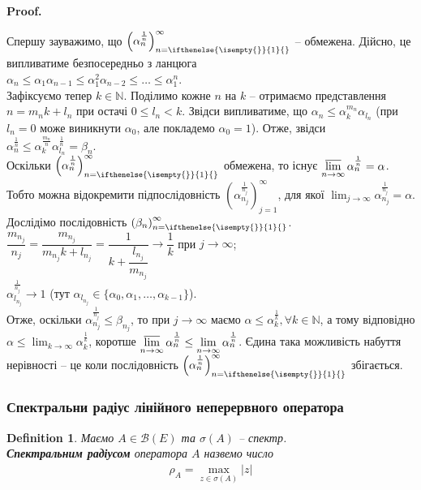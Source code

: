 \documentclass[a4paper, 10pt]{article}
\makeatletter
\theoremstyle{theoremdd}
\theoremstyle{theoremdd}
\newtheorem{definition}[theorem]{Definition}
\theoremstyle{theoremdd}
\theoremstyle{theoremdd}
\theoremstyle{theoremdd}
\theoremstyle{theoremdd}
\theoremstyle{theoremdd}
\theoremstyle{theoremdd}
\newcommand{\sequence}[2][]{\left({#2}\right)_{n=\ifthenelse{\isempty{#1}}{1}{#1}}^{\infty}}
\renewenvironment{proof}[1][Proof.\\]{\par
\pushQED{\hfill \qed}%
\normalfont \topsep6\p@\@plus6\p@\relax
\trivlist
\item\relax
{\bfseries
#1\@addpunct{.}}\hspace\labelsep\ignorespaces
}{%
\popQED\endtrivlist\@endpefalse
}
\makeatother
\begin{document}
\begin{proof}
Спершу зауважимо, що $\sequence{\alpha_n^{\frac{1}{n}}}$ -- обмежена. Дійсно, це випливатиме безпосередньо з ланцюга\\
$\alpha_n \leq \alpha_1 \alpha_{n-1} \leq \alpha_1^2 \alpha_{n-2} \leq \dots \leq \alpha_1^n$.\\
Зафіксуємо тепер $k \in \mathbb{N}$. Поділимо кожне $n$ на $k$ -- отримаємо представлення $n = m_n k + l_n$ при остачі $0 \leq l_n < k$. Звідси випливатиме, що $\alpha_n \leq \alpha_k^{m_n} \alpha_{l_n}$ (при $l_n = 0$ може виникнути $\alpha_0$, але покладемо $\alpha_0 = 1$). Отже, звідси $\alpha_n^{\frac{1}{n}} \leq \alpha_k^{\frac{m_n}{n}} \alpha_{l_n}^{\frac{1}{n}} = \beta_n$.\\
Оскільки $\sequence{\alpha_n^{\frac{1}{n}}}$ обмежена, то існує $\displaystyle\varlimsup_{n \to \infty} \alpha_n^{\frac{1}{n}} = \alpha$. Тобто можна відокремити підпослідовність $\left(\alpha_{n_j}^{\frac{1}{n_j}}\right)_{j=1}^\infty$, для якої $\displaystyle\lim_{j \to \infty} \alpha_{n_j}^{\frac{1}{n_j}} = \alpha$. Дослідімо послідовність $\sequence{\beta_n}$.\\
$\dfrac{m_{n_j}}{n_j} = \dfrac{m_{n_j}}{m_{n_j}k + l_{n_j}} = \dfrac{1}{k + \dfrac{l_{n_j}}{m_{n_j}}} \to \dfrac{1}{k}$ при $j \to \infty$;\\
$\alpha_{l_{n_j}}^{\frac{1}{n_j}} \to 1$ (тут $\alpha_{l_{n_j}} \in \{\alpha_0,\alpha_1,\dots,\alpha_{k-1}\}$).\\
Отже, оскільки $\alpha_{n_j}^{\frac{1}{n_j}} \leq \beta_{n_j}$, то при $j \to \infty$ маємо $\alpha \leq \alpha_k^{\frac{1}{k}}, \forall k \in \mathbb{N}$, а тому відповідно $\alpha \leq \displaystyle\lim_{k \to \infty} \alpha_k^{\frac{1}{k}}$, коротше $\displaystyle\varlimsup_{n \to \infty} \alpha_n^{\frac{1}{n}} \leq \lim_{n \to \infty} \alpha_n^{\frac{1}{n}}$. Єдина така можливість набуття нерівності -- це коли послідовність $\sequence{\alpha_n^{\frac{1}{n}}}$ збігається.
\end{proof}

\subsubsection{Спектральни радіус лінійного неперервного оператора}
\begin{definition}
Маємо $A \in \mathcal{B}(E)$ та $\sigma(A)$ -- спектр.\\
\textbf{Спектральним радіусом} оператора $A$ назвемо число
\begin{align*}
\rho_A = \max_{z \in \sigma(A)} |z|
\end{align*}
\end{definition}
\end{document}
